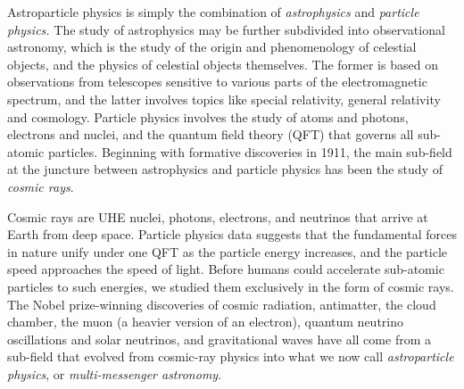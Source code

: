 \documentclass[../../main.tex]{subfiles}
\begin{document}
Astroparticle physics is simply the combination of \textit{astrophysics} and \textit{particle physics.}  The study of astrophysics may be further subdivided into observational astronomy, which is the study of the origin and phenomenology of celestial objects, and the physics of celestial objects themselves.  The former is based on observations from telescopes sensitive to various parts of the electromagnetic spectrum, and the latter involves topics like special relativity, general relativity and cosmology.  Particle physics involves the study of atoms and photons, electrons and nuclei, and the quantum field theory (QFT) that governs all sub-atomic particles.  Beginning with formative discoveries in 1911, the main sub-field at the juncture between astrophysics and particle physics has been the study of \textit{cosmic rays}. \\ \hspace{0.1cm}

Cosmic rays are UHE nuclei, photons, electrons, and neutrinos that arrive at Earth from deep space.  Particle physics data suggests that the fundamental forces in nature unify under one QFT as the particle energy increases, and the particle speed approaches the speed of light.  Before humans could accelerate sub-atomic particles to such energies, we studied them exclusively in the form of cosmic rays.  The Nobel prize-winning discoveries of cosmic radiation, antimatter, the cloud chamber, the muon (a heavier version of an electron), quantum neutrino oscillations and solar neutrinos, and gravitational waves have all come from a sub-field that evolved from cosmic-ray physics into what we now call \textit{astroparticle physics}, or \textit{multi-messenger astronomy}. \\ \hspace{0.1cm}
\end{document}
